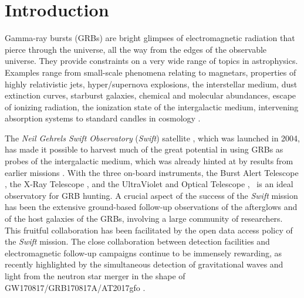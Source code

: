 \documentclass[longauth]{aa}    %
\begin{document}
\maketitle

\section{Introduction}

Gamma-ray bursts (GRBs) are bright glimpses of electromagnetic radiation that
pierce through the universe, all the way from the edges of the observable
universe. They provide constraints on a very wide range of topics in
astrophysics. Examples range from small-scale phenomena relating to magnetars,
properties of highly relativistic jets, hyper/supernova explosions, the
interstellar medium, dust extinction curves, starburst galaxies, chemical and
molecular abundances, escape of ionizing radiation, the ionization state of the
intergalactic medium, intervening absorption systems to standard candles in
cosmology \citep[e.g.,][]{Wijers1998, Savaglio2006, Ghirlanda2007, Molinari2007,
	Amati2008, Vergani2009, Prochaska2009, HjorthBloom2012, Rowlinson2017,
	Christensen2017}.

The \textit{Neil Gehrels Swift Observatory} ({\it Swift}) satellite
\citep{Gehrels2004, Gehrels2009}, which was launched in 2004, has made it
possible to harvest much of the great potential in using GRBs as probes of the
intergalactic medium, which was already hinted at by results from earlier
missions \citep[e.g.,][]{Paradijs2000, Ricker2004}. With the three on-board
instruments, the Burst Alert Telescope \citep[BAT;][]{Barthelmy2005}, the X-Ray
Telescope \citep[XRT;][]{Burrows2005}, and the UltraViolet and Optical Telescope
\citep[UVOT;][]{Roming2005}, \swift~is an ideal observatory for GRB hunting. A
crucial aspect of the success of the {\it Swift} mission has been the extensive
ground-based follow-up observations of the afterglows and of the host galaxies
of the GRBs, involving a large community of researchers. This fruitful
collaboration has been facilitated by the open data access policy of the {\it
	Swift} mission. The close collaboration between detection facilities and
electromagnetic  follow-up campaigns continue to be immensely rewarding, as
recently highlighted by the simultaneous detection of gravitational waves and
light from the neutron star merger in the shape of GW170817/GRB170817A/AT2017gfo
\citep{LIGOScientificCollaboration2017a, LIGOScientificCollaboration2017}.
\end{document}
